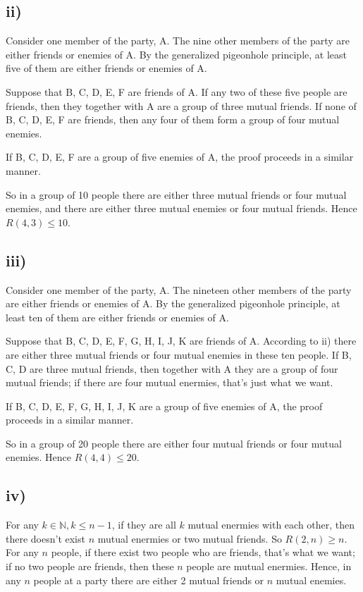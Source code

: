 \documentclass[a4paper,12pt,titlepage]{article}
\begin{document}
\subsection*{ii)}
Consider one member of the party, A. The nine other members of the party
are either friends or enemies of A. By the generalized pigeonhole principle, at least five of them are either friends or enemies of A. 

Suppose that B, C, D, E, F are friends of A.  If any two of these five people are friends, then they together with A are a group of three mutual friends. If none of B, C, D, E, F are friends, then any four of them form a group of four mutual enemies.

If B, C, D, E, F are a group of five enemies of A, the proof proceeds in a
similar manner.

So in a group of 10 people there are either three mutual friends or four mutual enemies, and there are either three mutual enemies or four mutual friends. Hence $R(4,3)\leqslant10$.

\subsection*{iii)}
Consider one member of the party, A. The nineteen other members of the party are either friends or enemies of A. By the generalized pigeonhole principle, at least ten of them are either friends or enemies of A. 

Suppose that B, C, D, E, F, G, H, I, J, K are friends of A. According to ii) there are either three mutual friends or four mutual enemies in these ten people. If B, C, D are three mutual friends, then together with A they are a group of four mutual friends; if there are four mutual enermies, that's just what we want. 

If B, C, D, E, F, G, H, I, J, K are a group of five enemies of A, the proof proceeds in a similar manner.

So in a group of 20 people there are either four mutual friends or four mutual enemies. Hence $R(4,4)\leqslant20$.

\subsection*{iv)}
For any $k\in\mathbb{N},k\leqslant n-1$, if they are all $k$ mutual enermies with each other, then there doesn't exist $n$ mutual enermies or two mutual friends. So $R(2,n)\geqslant n$. For any $n$ people, if there exist two people who are friends, that's what we want; if no two people are friends, then these $n$ people are mutual enermies. Hence, in any $n$ people at a party there are either 2 mutual friends or $n$ mutual enemies.
\end{document}
